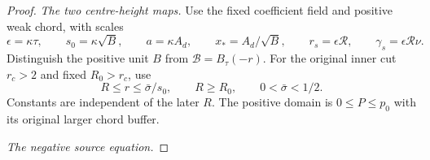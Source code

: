 \begin{proof}
\emph{The two centre-height maps.}
Use the fixed coefficient field and positive weak chord, with scales
\begin{equation}
 \epsilon=\kappa\tau,\qquad s_0=\kappa\sqrt B,\qquad
 a=\kappa A_d,\qquad x_* =A_d/\sqrt B,\qquad
 r_s=\epsilon\mathcal R,\qquad \gamma_s=\epsilon\mathcal R\nu .
 \label{deg:source-growing-phase-scales}
\end{equation}
Distinguish the positive unit $B$ from $\mathscr B=B_\tau(-r)$.
For the original inner cut $r_c>2$ and fixed $R_0>r_c$, use
\begin{equation}
 R\le r\le\bar\sigma/s_0,\qquad R\ge R_0,\qquad
 0<\bar\sigma<1/2 .
 \label{deg:source-growing-separate-domains}
\end{equation}
Constants are independent of the later $R$. The positive domain is
$0\le P\le p_0$ with its original larger chord buffer.

\smallskip
\noindent\emph{The negative source equation.}


\end{proof}
